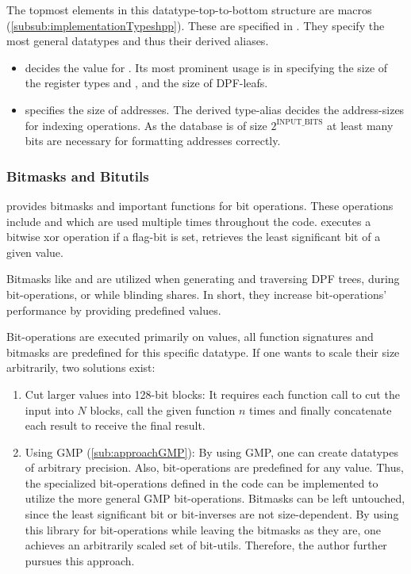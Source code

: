 The topmost elements in  this datatype-top-to-bottom structure are macros (\ref{subsub:implementationTypeshpp}).
These are specified in .
They specify the most general datatypes and thus their derived aliases.
\begin{itemize}
    \item {} decides the value for .
    Its most prominent usage is in specifying the size of the register types  and , and the size of DPF-leafs.
    \item {} specifies the size of addresses.
    The derived type-alias  decides the address-sizes for indexing operations.
    As the database is of size $2^\text{INPUT\_BITS}$ at least  many bits are necessary for formatting addresses correctly.
\end{itemize}

\subsubsection*{Bitmasks and Bitutils}\label{subsub:bitmasksAndBitutils}
 provides bitmasks and important functions for bit operations.
These operations include  and  which are used multiple times throughout the code.
 executes a bitwise xor operation if a flag-bit is set,  retrieves the least significant bit of a given  value.

Bitmasks like  and  are utilized when generating and traversing DPF trees, during bit-operations, or while blinding shares.
In short, they increase bit-operations' performance by providing predefined values.

Bit-operations are executed primarily on  values, all function signatures and bitmasks are predefined for this specific datatype.
If one wants to scale their size arbitrarily, two solutions exist:
\begin{enumerate}
    \item Cut larger values into 128-bit blocks:
    It requires each function call to cut the input into $N$ blocks, call the given function $n$ times and finally concatenate each result to receive the final result.
    \item Using GMP (\ref{sub:approachGMP}):
    By using GMP, one can create datatypes of arbitrary precision.
    Also, bit-operations are predefined for any  value.
    Thus, the specialized bit-operations defined in the code can be implemented to utilize the more general GMP bit-operations.
    Bitmasks can be left untouched, since the least significant bit or bit-inverses are not size-dependent.
    By using this library for bit-operations while leaving the bitmasks as they are, one achieves an arbitrarily scaled set of bit-utils.
    Therefore, the author further pursues this approach.
\end{enumerate}

